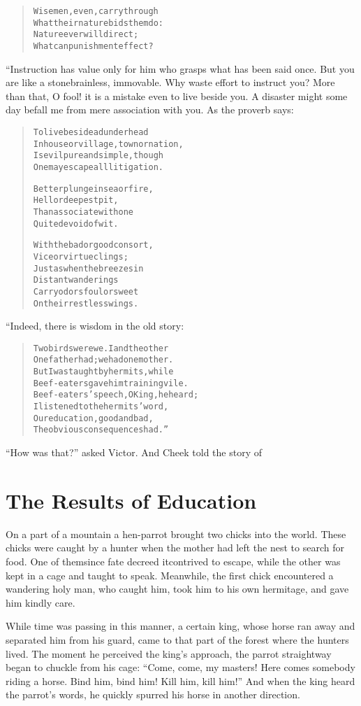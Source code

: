 \documentclass[article, twoside, 14pt]{memoir}
\renewenvironment{verbatim}{%
\begin{quote}%
\vskip -10pt%
\begin{alltt}\normalfont\large}{\end{alltt}%
\end{quote}%
\vskip -10pt
} %
\begin{document}
\begin{verbatim}
Wise men, even, carry through
What their nature bids them do:
Nature ever will direct;
What can punishment effect?
\end{verbatim}
“Instruction has value only for him who grasps what has been said
once. But you are like a stone{\textemdash}brainless, immovable. Why waste
effort to instruct you? More than that, O fool! it is a mistake
even to live beside you. A disaster might some day befall me from
mere association with you. As the proverb says:

\begin{verbatim}
To live beside a dunderhead
    In house or village, town or nation,
Is evil pure and simple, though
    One may escape all litigation.

Better plunge in sea or fire,
    Hell or deepest pit,
Than associate with one
    Quite devoid of wit.

With the bad or good consort,
    Vice or virtue clings;
Just as when the breezes in
    Distant wanderings
Carry odors foul or sweet
    On their restless wings.
\end{verbatim}
“Indeed, there is wisdom in the old story:

\begin{verbatim}
Two birds were we. I and the other
One father had; we had one mother.
But I was taught by hermits, while
Beef-eaters gave him training vile.
Beef-eaters' speech, O King, he heard;
I listened to the hermits' word,
Our education, good and bad,
The obvious consequences had.”
\end{verbatim}
``How was that?'' asked Victor. And Cheek told the story of

\chapter{The Results of Education}

\label{s32}

On a part of a mountain a hen-parrot brought two chicks into the
world. These chicks were caught by a hunter when the mother had
left the nest to search for food. One of them{\textemdash}since fate decreed
it{\textemdash}contrived to escape, while the other was kept in a cage and
taught to speak. Meanwhile, the first chick encountered a wandering
holy man, who caught him, took him to his own hermitage, and gave
him kindly care.

While time was passing in this manner, a certain king, whose horse
ran away and separated him from his guard, came to that part of the
forest where the hunters lived. The moment he perceived the king's
approach, the parrot straightway began to chuckle from his cage:
``Come, come, my masters! Here comes somebody riding a horse. Bind him, bind him! Kill him, kill him!''
And when the king heard the parrot's words, he quickly spurred his
horse in another direction.
\end{document}
